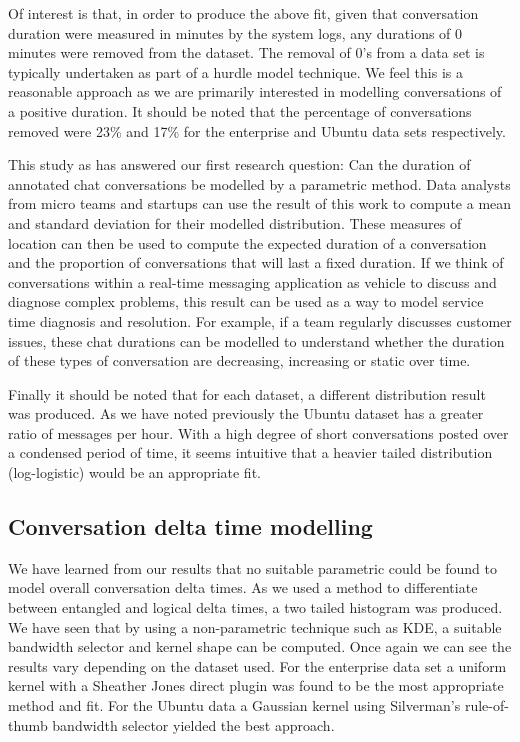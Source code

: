 \documentclass[conference]{IEEEtran}
\begin{document}
Of interest is that, in order to produce the above fit, given that conversation duration were measured in minutes by the system logs, any durations of 0 minutes were removed from the dataset. The removal of 0's from a data set is typically undertaken as part of a hurdle model technique. We feel this is a reasonable approach as we are primarily interested in modelling conversations of a positive duration. It should be noted that the percentage of conversations removed were 23\% and 17\% for the enterprise and Ubuntu data sets respectively. \par

This study as has answered our first research question: Can the duration of annotated chat conversations be modelled by a parametric method. Data analysts from micro teams and startups can use the result of this work to compute a mean and standard deviation for their modelled distribution. These measures of location can then be used to compute the expected duration of a conversation and the proportion of conversations that will last a fixed duration. If we think of conversations within a real-time messaging application as vehicle to discuss and diagnose complex problems, this result can be used as a way to model service time diagnosis and resolution. For example, if a team regularly discusses customer issues, these chat durations can be modelled to understand whether the duration of these types of conversation are decreasing, increasing or static over time. \par

Finally it should be noted that for each dataset, a different distribution result was produced. As we have noted previously the Ubuntu dataset has a greater ratio of messages per hour. With a high degree of short conversations posted over a condensed period of time, it seems intuitive that a heavier tailed distribution (log-logistic) would be an appropriate fit. \par

\subsection{Conversation delta time modelling}

We have learned from our results that no suitable parametric could be found to model overall conversation delta times. As we used a method to differentiate between entangled and logical delta times, a two tailed histogram was produced. We have seen that by using a non-parametric technique such as KDE, a suitable bandwidth selector and kernel shape can be computed. Once again we can see the results vary depending on the dataset used. For the enterprise data set a uniform kernel with a Sheather Jones direct plugin was found to be the most appropriate method and fit. For the Ubuntu data a Gaussian kernel using Silverman's rule-of-thumb bandwidth selector yielded the best approach.
\end{document}
